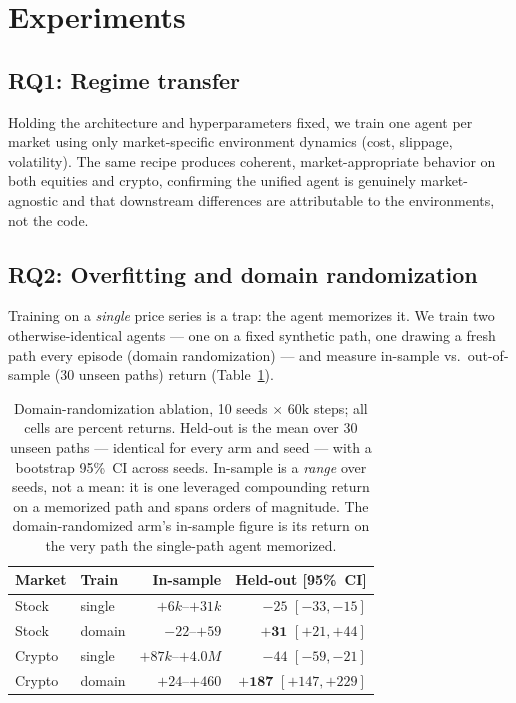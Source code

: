 \documentclass[10pt,twocolumn]{article}
\newcommand{\pc}{\%}  %
\begin{document}
\section{Experiments}

\subsection{RQ1: Regime transfer}
Holding the architecture and hyperparameters fixed, we train one agent per market
using only market-specific environment dynamics (cost, slippage, volatility). The
same recipe produces coherent, market-appropriate behavior on both equities and
crypto, confirming the unified agent is genuinely market-agnostic and that
downstream differences are attributable to the environments, not the code.

\subsection{RQ2: Overfitting and domain randomization}
\label{sec:ablation}
Training on a \emph{single} price series is a trap: the agent memorizes it. We
train two otherwise-identical agents --- one on a fixed synthetic path, one drawing
a fresh path every episode (domain randomization) --- and measure in-sample vs.\
out-of-sample (30 unseen paths) return (Table~\ref{tab:ablation}).

\begin{table}[t]\centering\footnotesize
\caption{Domain-randomization ablation, 10 seeds $\times$ 60k steps; all cells are
percent returns. Held-out is the mean over 30 unseen paths --- identical for every
arm and seed --- with a bootstrap 95\pc\ CI across seeds. In-sample is a
\emph{range} over seeds, not a mean: it is one leveraged compounding return on a
memorized path and spans orders of magnitude. The domain-randomized arm's in-sample
figure is its return on the very path the single-path agent memorized.}
\label{tab:ablation}
\setlength{\tabcolsep}{4pt}
\begin{tabular}{@{}llrr@{}}
\toprule
Market & Train & In-sample & Held-out [95\pc\ CI]\\
\midrule
Stock  & single & $+6k$--$+31k$ & $-25$ {\scriptsize$[-33,-15]$}\\
Stock  & domain & $-22$--$+59$ & $\mathbf{+31}$ {\scriptsize$[+21,+44]$}\\
Crypto & single & $+87k$--$+4.0M$ & $-44$ {\scriptsize$[-59,-21]$}\\
Crypto & domain & $+24$--$+460$ & $\mathbf{+187}$ {\scriptsize$[+147,+229]$}\\
\bottomrule
\end{tabular}
\end{table}
\end{document}
